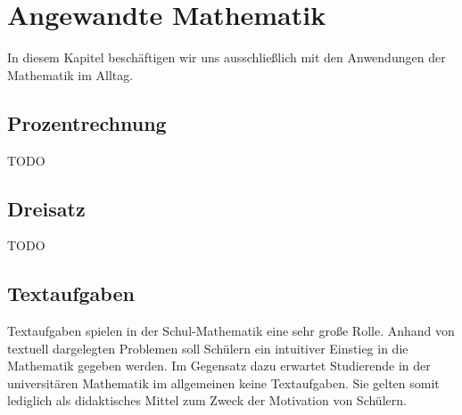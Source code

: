 
\chapter{Angewandte Mathematik}

In diesem Kapitel beschäftigen wir uns ausschließlich mit den Anwendungen der Mathematik im Alltag. 


\section{Prozentrechnung}
TODO

\section{Dreisatz}
TODO


\section{Textaufgaben}

Textaufgaben spielen in der Schul-Mathematik eine sehr große Rolle. Anhand von textuell dargelegten Problemen soll Schülern ein intuitiver Einstieg in die Mathematik gegeben werden. Im Gegensatz dazu erwartet Studierende in der universitären Mathematik im allgemeinen keine Textaufgaben. Sie gelten somit lediglich als didaktisches Mittel zum Zweck der Motivation von Schülern. 


